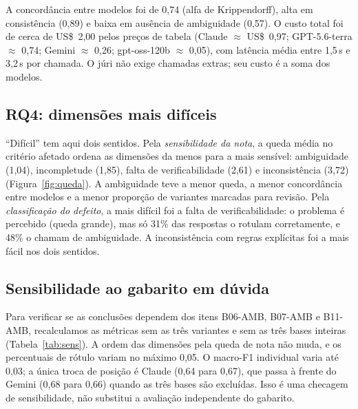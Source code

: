 \documentclass[12pt]{article}
\begin{document}
A concordância entre modelos foi de 0,74 (alfa de Krippendorff), alta em consistência (0,89) e baixa em ausência de ambiguidade (0,57). O custo total foi de cerca de US\$~2,00 pelos preços de tabela (Claude $\approx$ US\$~0,97; GPT-5.6-terra $\approx$ 0,74; Gemini $\approx$ 0,26; gpt-oss-120b $\approx$ 0,05), com latência média entre 1,5\,s e 3,2\,s por chamada. O júri não exige chamadas extras; seu custo é a soma dos modelos.

\subsection{RQ4: dimensões mais difíceis}

``Difícil'' tem aqui dois sentidos. Pela \emph{sensibilidade da nota}, a queda média no critério afetado ordena as dimensões da menos para a mais sensível: ambiguidade (1,04), incompletude (1,85), falta de verificabilidade (2,61) e inconsistência (3,72) (Figura~\ref{fig:queda}). A ambiguidade teve a menor queda, a menor concordância entre modelos e a menor proporção de variantes marcadas para revisão. Pela \emph{classificação do defeito}, a mais difícil foi a falta de verificabilidade: o problema é percebido (queda grande), mas só 31\% das respostas o rotulam corretamente, e 48\% o chamam de ambiguidade. A inconsistência com regras explícitas foi a mais fácil nos dois sentidos.

\subsection{Sensibilidade ao gabarito em dúvida}\label{sec:sens}

Para verificar se as conclusões dependem dos itens B06-AMB, B07-AMB e B11-AMB, recalculamos as métricas sem as três variantes e sem as três bases inteiras (Tabela~\ref{tab:sens}). A ordem das dimensões pela queda de nota não muda, e os percentuais de rótulo variam no máximo 0,05. O macro-F1 individual varia até 0,03; a única troca de posição é Claude (0,64 para 0,67), que passa à frente do Gemini (0,68 para 0,66) quando as três bases são excluídas. Isso é uma checagem de sensibilidade, não substitui a avaliação independente do gabarito.
\end{document}
